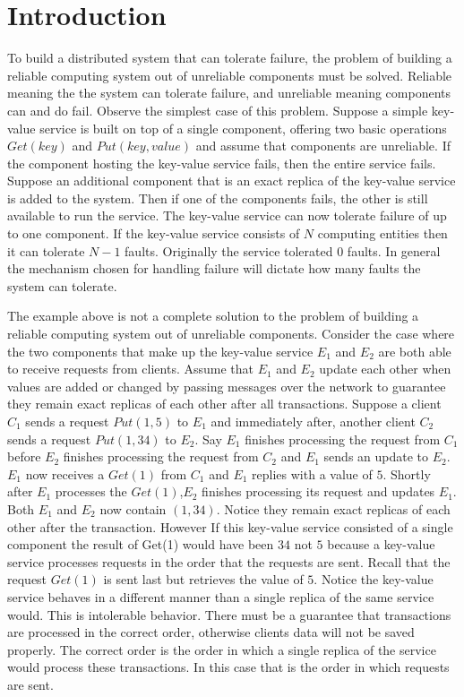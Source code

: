 \documentclass[conference]{IEEEtran}
\begin{document}
\section{Introduction}
To build a distributed system that can tolerate failure, the problem of building a reliable computing system out of unreliable components must be solved. Reliable meaning the the system can tolerate failure, and unreliable meaning components can and do fail. Observe the simplest case of this problem. Suppose a simple key-value service is built on top of a single component, offering two basic operations \(Get(key)\) and \(Put(key, value)\) and assume that components are unreliable. If the component hosting the key-value service fails, then the entire service fails. Suppose an additional component that is an exact replica of the key-value service is added to the system. Then if one of the components fails, the other is still available to run the service. The key-value service can now tolerate failure of up to one component. If the key-value service consists of \(N\) computing entities then it can tolerate \(N-1\) faults. Originally the service tolerated \(0\) faults. In general the mechanism chosen for handling failure will dictate how many faults the system can tolerate. 

The example above is not a complete solution to the problem of building a reliable computing system out of unreliable components. Consider the case where the two components that make up the key-value service \(E_1\) and \(E_2\) are both able to receive requests from clients. Assume that \(E_1\) and \(E_2\) update each other when values are added or changed by passing messages over the network to guarantee they remain exact replicas of each other after all transactions. Suppose a client \(C_1\) sends a request \(Put(1, 5)\) to \(E_1\) and immediately after, another client \(C_2\) sends a request \(Put(1,34)\) to \(E_2\). Say \(E_1\) finishes processing the request from \(C_1\)  before \(E_2\) finishes processing the request from \(C_2\) and \(E_1\) sends an update to \(E_2\). \(E_1\) now receives a \(Get(1)\) from \(C_1\) and \(E_1\) replies with a value of \(5\). Shortly after \(E_1\) processes the \(Get(1)\),\(E_2\) finishes processing its request and updates \(E_1\). Both \(E_1\) and \(E_2\) now contain \((1, 34)\). Notice they remain exact replicas of each other after the transaction. However If this key-value service consisted of a single component the result of Get(1) would have been \(34\) not \(5\) because a key-value service processes requests in the order that the requests are sent. Recall that the request \(Get(1)\) is sent last but retrieves the value of \(5\). Notice the key-value service behaves in a different manner than a single replica of the same service would. This is intolerable behavior. There must be a guarantee that transactions are processed in the correct order, otherwise clients data will not be saved properly. The correct order is the order in which a single replica of the service would process these transactions. In this case that is the order in which requests are sent. 
\end{document}
